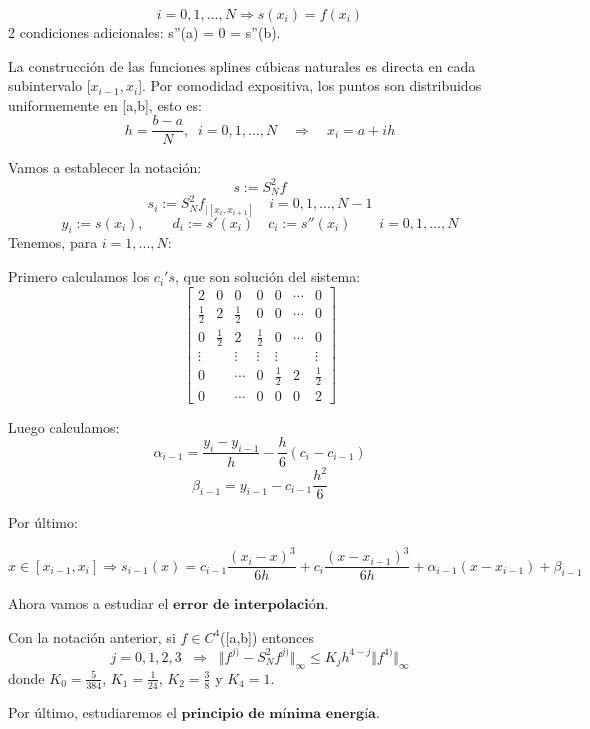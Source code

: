 \begin{ndef}
\[ i=0,1,...,N \Rightarrow s(x_i) = f(x_i) \]
2 condiciones adicionales: s''(a) = 0 = s''(b).
\end{ndef}

La construcción de las funciones splines cúbicas naturales es directa en cada subintervalo [$x_{i-1},x_i$]. Por comodidad expositiva, los puntos son distribuidos uniformemente en [a,b], esto es:
\[ h= \frac{b-a}{N}, \; \; i=0,1,...,N \quad \Rightarrow \quad x_i=a+ih \]

Vamos a establecer la notación:
\[ s:= S_N^2f \]
\[ s_i := S_N^2 f_{\vert \left[ x_i, x_{i+1} \right]} \quad i=0,1,...,N-1 \]
\[ y_i:=s(x_i), \qquad d_i:=s'(x_i) \quad c_i:=s''(x_i) \qquad i=0,1,...,N \]
Tenemos, para $i=1,...,N$:

Primero calculamos los $c_i's$, que son solución del sistema:
\[ \begin{bmatrix}
2 & 0 & 0 & 0 & 0 & \cdots & 0 \\
\frac{1}{2} & 2 & \frac{1}{2} & 0 & 0 & \cdots & 0 \\
0 & \frac{1}{2} & 2 & \frac{1}{2} & 0 & \cdots & 0 \\
\vdots & & \vdots & \vdots & \vdots & & \vdots \\
0 & & \cdots & 0 & \frac{1}{2} & 2 & \frac{1}{2} \\
0 & & \cdots & 0 & 0 & 0 & 2 
\end{bmatrix} \]

Luego calculamos:
\[ \alpha _{i-1} = \frac{y_i - y_{i-1}}{h} - \frac{h}{6} (c_i-c_{i-1}) \]
\[ \beta _{i-1} = y_{i-1} - c_{i-1} \frac{h^2}{6} \]

Por último:

\[ x \in \left[ x_{i-1},x_i \right] \Rightarrow s_{i-1}(x) = c_{i-1} \frac{(x_i-x)^3}{6h}+c_i \frac{(x-x_{i-1})^3}{6h} + \alpha _{i-1} (x-x_{i-1}) + \beta _{i-1} \]

Ahora vamos a estudiar el $\textbf{error de interpolación}$.

\begin{nprop}
Con la notación anterior, si $f \in C^4$([a,b]) entonces
\[ j=0,1,2,3 \; \; \Rightarrow \; \; \Vert f^{j)} - S_N^2f^{j)} \Vert _\infty \leq K_jh^{4-j} \Vert f^{4)} \Vert _\infty \]
donde $K_0=\frac{5}{384}$, $K_1 = \frac{1}{24}$, $K_2 = \frac{3}{8}$ y $K_4 = 1$.
\end{nprop}

Por último, estudiaremos el $\textbf{principio de mínima energía}$.

